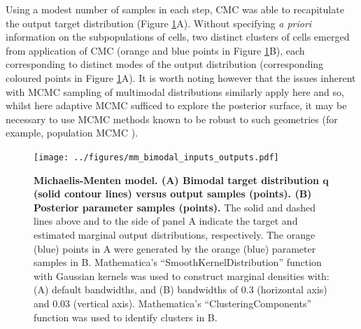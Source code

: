 Using a modest number of samples in each step, CMC was able to recapitulate the output target distribution (Figure \ref{fig:mm_bimodal_inputs_outputs}A). Without specifying \textit{a priori} information on the subpopulations of cells, two distinct clusters of cells emerged from application of CMC (orange and blue points in Figure \ref{fig:mm_bimodal_inputs_outputs}B), each corresponding to distinct modes of the output distribution (corresponding coloured points in Figure \ref{fig:mm_bimodal_inputs_outputs}A). It is worth noting however that the issues inherent with MCMC sampling of multimodal distributions similarly apply here and so, whilst here adaptive MCMC \cite{johnstone2016uncertainty} sufficed to explore the posterior surface, it may be necessary to use MCMC methods known to be robust to such geometries (for example, population MCMC \cite{jasra2007population}).

\begin{figure}[H]
\centerline{\texttt{[image: ../figures/mm\_bimodal\_inputs\_outputs.pdf]}}
\caption{\textbf{Michaelis-Menten model. (A) Bimodal target distribution $\boldsymbol{q}$ (solid contour lines) versus output samples (points). (B) Posterior parameter samples (points).} The solid and dashed lines above and to the side of panel A indicate the target and estimated marginal output distributions, respectively. The orange (blue) points in A were generated by the orange (blue) parameter samples in B. %
Mathematica's ``SmoothKernelDistribution'' function \cite{mathematica} with Gaussian kernels was used to construct marginal densities with: (A) default bandwidths, and (B) bandwidths of 0.3 (horizontal axis) and 0.03 (vertical axis). Mathematica's ``ClusteringComponents'' function \cite{mathematica} was used to identify clusters %
in B.}
\label{fig:mm_bimodal_inputs_outputs}
\end{figure}

